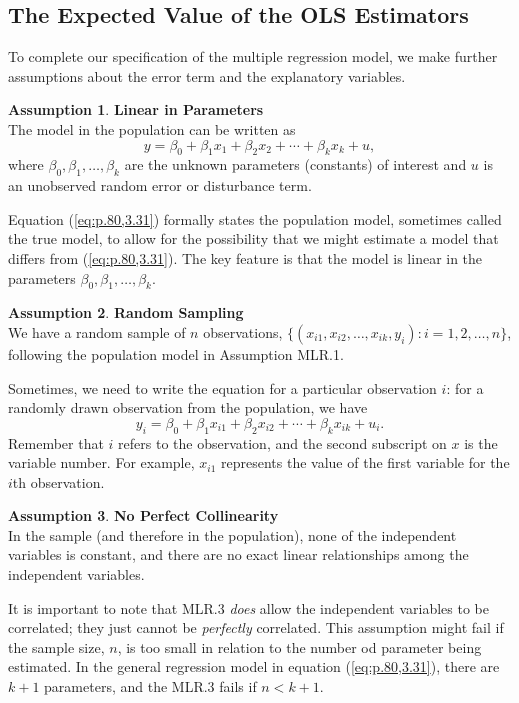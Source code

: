 \documentclass[a4paper, 10pt]{article}
\theoremstyle{definition}	%
\newtheorem{assumption}{Assumption}
\begin{document}
\subsection{The Expected Value of the OLS Estimators}
To complete our specification of the multiple regression model, we make further assumptions about the error term and the explanatory variables.
\begin{assumption}
    \textbf{Linear in Parameters}\\
    The model in the population can be written as
    \begin{equation}
    y = \beta_0 + \beta_1 x_1 + \beta_2 x_2 + \cdots + \beta_k x_k + u, \label{eq:p.80,3.31}
    \end{equation}
    where $\beta_0, \beta_1, \dots, \beta_k$ are the unknown parameters (constants) of interest and $u$ is an unobserved random error or disturbance term.
\end{assumption}
 Equation (\ref{eq:p.80,3.31}) formally states the population model, sometimes called the true model, to allow for the possibility that we might estimate a model that differs from (\ref{eq:p.80,3.31}). The key feature is that the model is linear in the parameters $\beta_0, \beta_1, \dots, \beta_k$. 
\begin{assumption}
    \textbf{Random Sampling}\\
    We have a random sample of $n$ observations, $\{(x_{i1}, x_{i2}, \ldots, x_{ik}, y_i) : i = 1, 2, \ldots, n\}$, following the population model in Assumption MLR.1.
\end{assumption}
Sometimes, we need to write the equation for a particular observation $i$: for a randomly drawn observation from the population, we have
\begin{equation}
y_i = \beta_0 + \beta_1 x_{i1} + \beta_2 x_{i2} + \cdots + \beta_k x_{ik} + u_i.
\label{eq:p.80,3.32}
\end{equation}
Remember that $i$ refers to the observation, and the second subscript on $x$ is the variable number. For example, $x_{i1}$ represents the value of the first variable for the $i$th observation.
\begin{assumption}
    \textbf{No Perfect Collinearity}\\
    In the sample (and therefore in the population), none of the independent variables is constant, and there are no exact linear relationships among the independent variables.
\end{assumption}
It is important to note that MLR.3 \textit{does} allow the independent variables to be correlated; they just cannot be \textit{perfectly} correlated. This assumption might fail if the sample size, $n$, is too small in relation to the number od parameter being estimated. In the general regression model in equation (\ref{eq:p.80,3.31}), there are $k+1$ parameters, and the MLR.3 fails if $n < k+1$.
\end{document}
